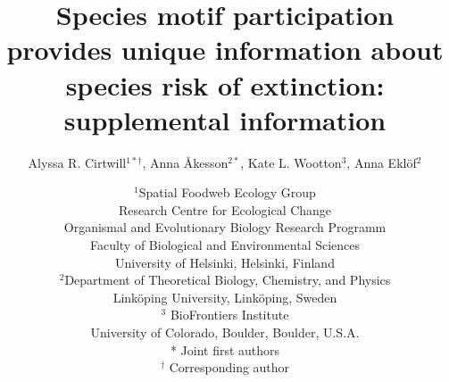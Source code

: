 \documentclass[12pt]{article}
\begin{document}
 

\title{Species motif participation provides unique information about species risk of extinction: supplemental information}

\author{Alyssa R. Cirtwill$^{1*\dagger}$, Anna \r{A}kesson$^{2*}$, Kate L. Wootton$^{3}$, Anna Ekl\"{o}f$^{2}$} 
\date{
\small$^1$Spatial Foodweb Ecology Group\\
Research Centre for Ecological Change\\
Organismal and Evolutionary Biology Research Programm\\
Faculty of Biological and Environmental Sciences\\
University of Helsinki, Helsinki, Finland\\
\medskip
\small$^2$Department of Theoretical Biology, Chemistry, and Physics\\ 
Link\"{o}ping University, Link\"{o}ping, Sweden\\
\medskip
\small$^3$ BioFrontiers Institute\\
University of Colorado, Boulder, Boulder, U.S.A.\\
\medskip
* Joint first authors\\
\medskip
$^\dagger$ Corresponding author\\
}


\raggedright
\end{document}
